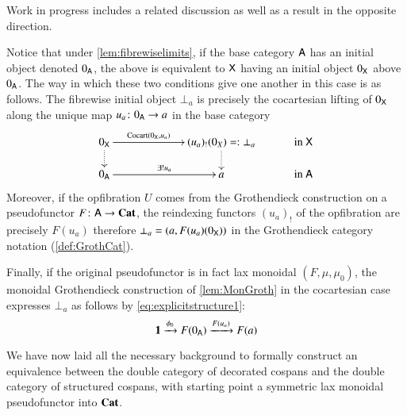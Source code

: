 \documentclass[reqno]{amsart}
\begin{document}
Work in progress \cite{CV} includes a related discussion as well as a result in the opposite direction.

\begin{rmk}\label{rmk:important}
Notice that under \cref{lem:fibrewiselimits}, if the base category $\mathsf{A}$ has an initial object denoted $0_{\mathsf{A}}$, the above is equivalent to $\mathsf{X}$ having an initial object $0_{\mathsf{X}}$ above $0_{\mathsf{A}}$. The way in which these two conditions give one another in this case is as follows. 
The fibrewise initial object $\bot_a$ is precisely the cocartesian lifting of $0_{\mathsf{X}}$ along the unique map $u_a\colon0_{\mathsf{A}}\to a$ in the base category
\begin{displaymath}
\xymatrix @C=.4in @R=.2in
{0_\X \ar @{.>}[d]\ar[rr]^-{\mathrm{Cocart}(0_\X,u_a)} && (u_a)_!(0_X)=:\bot_a\ar @{.>}[d] & \textrm{in }\X  \\
0_\A\ar[rr]^-{\exists!u_a} && a & \textrm{in }\A}
\end{displaymath}
Moreover, if the opfibration $U$ comes from the Grothendieck construction on a pseudofunctor $F\colon\mathsf{A}\to\mathbf{Cat}$, the reindexing functors $(u_a)_!$ of the opfibration are precisely $F(u_a)$ therefore $\bot_a=(a,F(u_a)(0_{\mathsf{X}}))$ in the Grothendieck category notation (\cref{def:GrothCat}).

Finally, if the original pseudofunctor is in fact lax monoidal $(F,\mu,\mu_0)$, the monoidal Grothendieck construction of \cref{lem:MonGroth} in the cocartesian case expresses $\bot_a$ as follows by \cref{eq:explicitstructure1}:
\begin{equation}\label{eq:initialinfibre}
\mathbf{1}\xrightarrow{\phi_0}F(0_{\mathsf{A}})\xrightarrow{F(u_a)}F(a) 
\end{equation}
\end{rmk}

We have now laid all the necessary background to formally construct an equivalence between the double category of decorated cospans and the double category of structured cospans, with starting point a symmetric lax monoidal pseudofunctor into $\mathbf{Cat}$.
\end{document}
